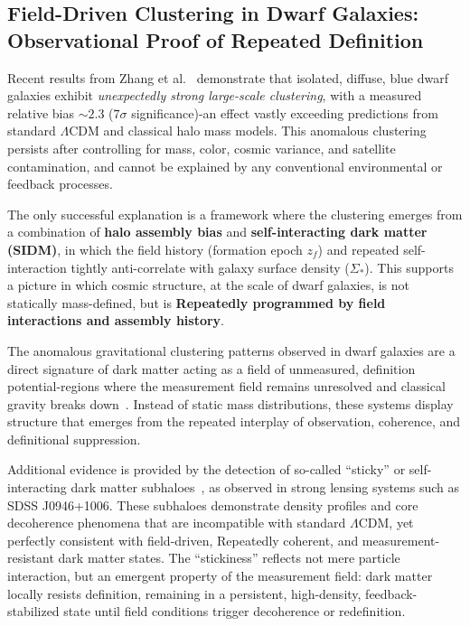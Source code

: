 \subsection*{Field-Driven Clustering in Dwarf Galaxies: Observational Proof of Repeated Definition}

Recent results from Zhang et al.~\cite{zhang2025} demonstrate that isolated, diffuse, blue dwarf galaxies exhibit \emph{unexpectedly strong large-scale clustering}, with a measured relative bias $\sim2.3$ ($7\sigma$ significance)-an effect vastly exceeding predictions from standard $\Lambda$CDM and classical halo mass models. This anomalous clustering persists after controlling for mass, color, cosmic variance, and satellite contamination, and cannot be explained by any conventional environmental or feedback processes.

The only successful explanation is a framework where the clustering emerges from a combination of \textbf{halo assembly bias} and \textbf{self-interacting dark matter (SIDM)}, in which the field history (formation epoch $z_f$) and repeated self-interaction tightly anti-correlate with galaxy surface density ($\Sigma_*$). This supports a picture in which cosmic structure, at the scale of dwarf galaxies, is not statically mass-defined, but is \textbf{Repeatedly programmed by field interactions and assembly history}.

The anomalous gravitational clustering patterns observed in dwarf galaxies are a direct signature of dark matter acting as a field of unmeasured, definition potential-regions where the measurement field remains unresolved and classical gravity breaks down~\cite{zhang2025}. Instead of static mass distributions, these systems display structure that emerges from the repeated interplay of observation, coherence, and definitional suppression.

Additional evidence is provided by the detection of so-called ``sticky'' or self-interacting dark matter subhaloes~\cite{enzi_overconcentrated_2025}, as observed in strong lensing systems such as SDSS J0946+1006. These subhaloes demonstrate density profiles and core decoherence phenomena that are incompatible with standard $\Lambda$CDM, yet perfectly consistent with field-driven, Repeatedly coherent, and measurement-resistant dark matter states. The ``stickiness'' reflects not mere particle interaction, but an emergent property of the measurement field: dark matter locally resists definition, remaining in a persistent, high-density, feedback-stabilized state until field conditions trigger decoherence or redefinition.

